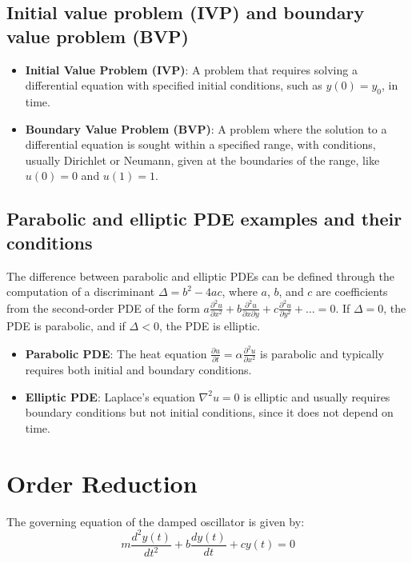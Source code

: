 \documentclass{article}
\begin{document}
\subsection{Initial value problem (IVP) and boundary value problem (BVP)}
\begin{itemize}
    \item \textbf{Initial Value Problem (IVP)}: A problem that requires solving a differential equation with specified initial conditions, such as \( y(0) = y_0 \), in time.
    \item \textbf{Boundary Value Problem (BVP)}: A problem where the solution to a differential equation is sought within a specified range, with conditions, usually Dirichlet or Neumann, given at the boundaries of the range, like \( u(0) = 0 \) and \( u(1) = 1 \).
\end{itemize}

\subsection{Parabolic and elliptic PDE examples and their conditions}
The difference between parabolic and elliptic PDEs can be defined through the computation of a discriminant \( \Delta = b^2 - 4ac \), where \( a \), \( b \), and \( c \) are coefficients from the second-order PDE of the form \( a \frac{\partial^2 u}{\partial x^2} + b \frac{\partial^2 u}{\partial x \partial y} + c \frac{\partial^2 u}{\partial y^2} + \ldots = 0 \). If \( \Delta = 0 \), the PDE is parabolic, and if \( \Delta < 0 \), the PDE is elliptic.
\begin{itemize}
    \item \textbf{Parabolic PDE}: The heat equation \( \frac{\partial u}{\partial t} = \alpha \frac{\partial^2 u}{\partial x^2} \) is parabolic and typically requires both initial and boundary conditions.
    \item \textbf{Elliptic PDE}: Laplace's equation \( \nabla^2 u = 0 \) is elliptic and usually requires boundary conditions but not initial conditions, since it does not depend on time.
\end{itemize}

\section{Order Reduction}

The governing equation of the damped oscillator is given by:
\begin{equation}
m \frac{d^2 y(t)}{dt^2} + b \frac{dy(t)}{dt} + c y(t) = 0
\end{equation}
\end{document}

